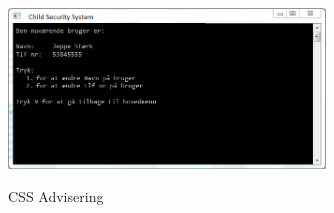 \begin{figure}[h] \centering
{\includegraphics[width=0.75\textwidth]{billeder/cmdprompt/CSS_advisering}}
\caption{CSS Advisering}
\end{figure}



